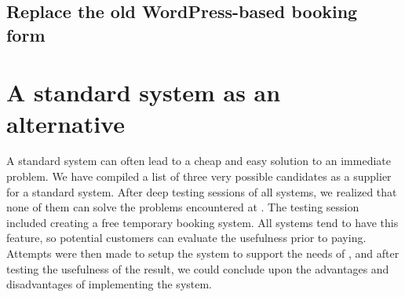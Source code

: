 \subsection{Replace the old WordPress-based booking form}

\newpage
\section{A standard system as an alternative}
A standard system can often lead to a cheap and easy solution to an immediate
problem.  We have compiled a list of three very possible candidates as a
supplier for a standard system.  After deep testing sessions of all systems, we
realized that none of them can solve the problems encountered at \gomonkey{}.
The testing session included creating a free temporary booking system. All
systems tend to have this feature, so potential customers can evaluate the
usefulness prior to paying. Attempts were then made to setup the system to
support the needs of \gomonkey{}, and after testing the usefulness of the
result, we could conclude upon the advantages and disadvantages of implementing
the system.

